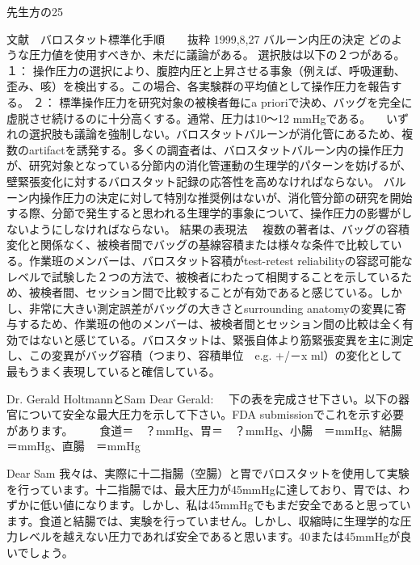 先生方の25%


文献　バロスタット標準化手順　　抜粋 	1999,8,27
バルーン内圧の決定
	どのような圧力値を使用すべきか、未だに議論がある。
選択肢は以下の２つがある。
	１： 	操作圧力の選択により、腹腔内圧と上昇させる事象（例えば、呼吸運動、歪み、咳）を検出する。この場合、各実験群の平均値として操作圧力を報告する。
	２： 	標準操作圧力を研究対象の被検者毎にa prioriで決め、バッグを完全に虚脱させ続けるのに十分高くする。通常、圧力は10～12 mmHgである。
　いずれの選択肢も議論を強制しない。バロスタットバルーンが消化管にあるため、複数のartifactを誘発する。多くの調査者は、バロスタットバルーン内の操作圧力が、研究対象となっている分節内の消化管運動の生理学的パターンを妨げるが、壁緊張変化に対するバロスタット記録の応答性を高めなければならない。
バルーン内操作圧力の決定に対して特別な推奨例はないが、消化管分節の研究を開始する際、分節で発生すると思われる生理学的事象について、操作圧力の影響がしないようにしなければならない。
結果の表現法
　複数の著者は、バッグの容積変化と関係なく、被検者間でバッグの基線容積または様々な条件で比較している。作業班のメンバーは、バロスタット容積がtest-retest reliabilityの容認可能なレベルで試験した２つの方法で、被検者にわたって相関することを示しているため、被検者間、セッション間で比較することが有効であると感じている。しかし、非常に大きい測定誤差がバッグの大きさとsurrounding anatomyの変異に寄与するため、作業班の他のメンバーは、被検者間とセッション間の比較は全く有効ではないと感じている。バロスタットは、緊張自体より筋緊張変異を主に測定し、この変異がバッグ容積（つまり、容積単位　e.g. +/－x ml）の変化として最もうまく表現していると確信している。

Dr. Gerald HoltmannとSam
Dear Gerald:
　下の表を完成させ下さい。以下の器官について安全な最大圧力を示して下さい。FDA submissionでこれを示す必要があります。
　　食道＝　？mmHg、胃＝　？mmHg、小腸　＝mmHg、結腸　＝mmHg、直腸　＝mmHg

Dear Sam
我々は、実際に十二指腸（空腸）と胃でバロスタットを使用して実験を行っています。十二指腸では、最大圧力が45mmHgに達しており、胃では、わずかに低い値になります。しかし、私は45mmHgでもまだ安全であると思っています。食道と結腸では、実験を行っていません。しかし、収縮時に生理学的な圧力レベルを越えない圧力であれば安全であると思います。40または45mmHgが良いでしょう。

